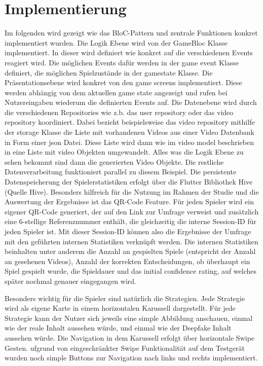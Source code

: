 \section{Implementierung} 
Im folgenden wird gezeigt wie das BloC-Pattern und zentrale Funktionen konkret implementiert wurden. 
Die Logik Ebene wird von der GameBloc Klasse implementiert. 
In dieser wird definiert wie konkret auf die verschiedenen Events reagiert wird. 
Die möglichen Events dafür werden in der game event Klasse definiert, die möglichen Spielzustände in der gamestate Klasse.
Die Präsentationsebene wird konkret von den game screens implementiert. 
Diese werden abhängig von dem aktuellen game state angezeigt und rufen bei Nutzereingaben wiederum die definierten Events auf. 
Die Datenebene wird durch die verschiedenen Repositories wie z.b. das user repository oder das video repository koordiniert. 
Dabei bezieht beispielsweise das video repository mithilfe der storage Klasse die Liste mit vorhandenen Videos aus einer Video Datenbank in Form einer json Datei. 
Diese Liste wird dann wie im video model beschrieben in eine Liste mit video Objekten umgewandelt. 
Alles was die Logik Ebene zu sehen bekommt sind dann die generierten Video Objekte. 
Die restliche Datenverarbeitung funktioniert parallel zu diesem Beispiel.
Die persistente Datenspeicherung der Spielerstatistiken erfolgt über die Flutter Bibliothek Hive (Quelle Hive). 
Besonders hilfreich für die Nutzung im Rahmen der Studie und die Auswertung der Ergebnisse ist das QR-Code Feature. 
Für jeden Spieler wird ein eigener QR-Code generiert, der auf den Link zur Umfrage verweist und zusätzlich eine 6-stellige Referenznummer enthält, 
die gleichzeitig die interne Session-ID für jeden Spieler ist. 
Mit dieser Session-ID können also die Ergebnisse der Umfrage mit den geführten internen Statistiken verknüpft werden. 
Die internen Statistiken beinhalten unter anderem die Anzahl an gespielten Spiele (entspricht der Anzahl an gesehenen Videos), 
Anzahl der korrekten Entscheidungen, ob überhaupt ein Spiel gespielt wurde, die Spieldauer und das initial confidence rating, auf welches später nochmal genauer eingegangen wird.  

Besonders wichtig für die Spieler sind natürlich die Strategien. 
Jede Strategie wird als eigene Karte in einem horizontalen Karussell dargestellt. 
Für jede Strategie kann der Nutzer sich jeweils eine simple Abbildung anschauen, einmal wie der reale Inhalt aussehen würde, und einmal wie der Deepfake Inhalt aussehen würde. 
Die Navigation in dem Karussell erfolgt über horizontale Swipe Gesten. 
ufgrund von eingeschränkter Swipe Funktionalität auf dem Testgerät wurden noch simple Buttons zur Navigation nach links und rechts implementiert.
